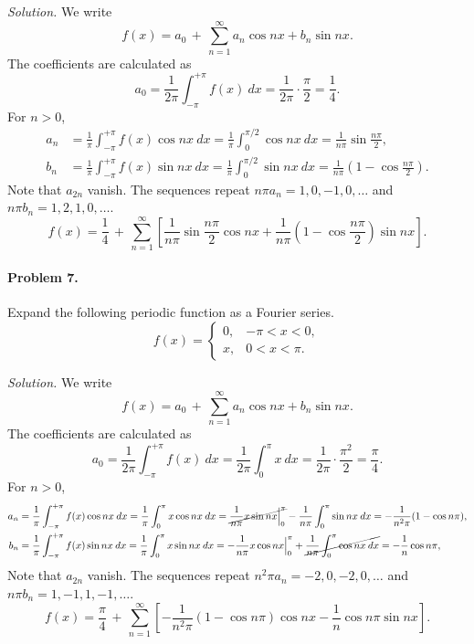 \documentclass[10pt]{article}
\begin{document}
        \textit{Solution.} We write
        \[
                f(x) = a_0 \,+\, \sum_{n = 1}^\infty a_n\cos{nx} + b_n\sin{nx}.
        \]
        The coefficients are calculated as
        \[
                a_0 = \frac{1}{2\pi}\int_{-\pi}^{+\pi} f(x)\:dx = \frac{1}{2\pi}\cdot \frac{\pi}{2} = \frac{1}{4}.
        \]
        For $n > 0$,
        \begin{align*}
                a_n &= \frac{1}{\pi}\int_{-\pi}^{+\pi} f(x)\cos{nx}\:dx = \frac{1}{\pi}\int_{0}^{\pi/2}\cos{nx}\:dx = \frac{1}{n\pi}\sin\frac{n\pi}{2}, \\
                b_n &= \frac{1}{\pi}\int_{-\pi}^{+\pi} f(x)\sin{nx}\:dx = \frac{1}{\pi}\int_{0}^{\pi/2}\sin{nx}\:dx = 
                        \frac{1}{n\pi}\left(1 - \cos\frac{n\pi}{2}\right).
        \end{align*}
        Note that $a_{2n}$ vanish. The sequences repeat $n\pi a_n = 1, 0, -1, 0, \dots$ and $n\pi b_n = 1, 2, 1, 0, \dots$.
        \[
                f(x) = \frac{1}{4} \,+\, \sum_{n = 1}^\infty \left[ \frac{1}{n\pi}\sin\frac{n\pi}{2}\cos{nx} + 
                        \frac{1}{n\pi}\left(1 - \cos\frac{n\pi}{2}\right)\sin{nx} \right].
        \]
        
        \paragraph{Problem 7.} Expand the following periodic function as a Fourier series.
        \[
                f(x) = \begin{cases}
                        0, & -\pi < x < 0,      \\
                        x, & 0 < x < \pi.
                \end{cases}
        \]
        
        \textit{Solution.} We write
        \[
                f(x) = a_0 \,+\, \sum_{n = 1}^\infty a_n\cos{nx} + b_n\sin{nx}.
        \]
        The coefficients are calculated as
        \[
                a_0 = \frac{1}{2\pi}\int_{-\pi}^{+\pi} f(x)\:dx = \frac{1}{2\pi}\int_0^\pi x\:dx = \frac{1}{2\pi}\cdot \frac{\pi^2}{2} = \frac{\pi}{4}.
        \]
        For $n > 0$,
        \begin{align*}
                a_n &= \frac{1}{\pi}\int_{-\pi}^{+\pi} f(x)\cos{nx}\:dx 
                        = \frac{1}{\pi}\int_0^\pi x\cos{nx}\:dx 
                        = \cancel{\frac{1}{n\pi}x\sin{nx}\Big|_0^\pi} - \frac{1}{n\pi}\int_0^\pi \sin{nx}\:dx 
                        = -\frac{1}{n^2\pi}(1 - \cos{n\pi}), \\
                b_n &= \frac{1}{\pi}\int_{-\pi}^{+\pi} f(x)\sin{nx}\:dx 
                        = \frac{1}{\pi}\int_0^\pi x\sin{nx}\:dx 
                        = -\frac{1}{n\pi}x\cos{nx}\Big|_0^\pi + \cancel{\frac{1}{n\pi}\int_0^\pi \cos{nx}\:dx }
                        = -\frac{1}{n}\cos{n\pi}, \\
        \end{align*}
        Note that $a_{2n}$ vanish. The sequences repeat $n^2\pi a_n = -2, 0, -2, 0, \dots$ and $n\pi b_n = 1, -1, 1, -1, \dots$.
        \[
                f(x) = \frac{\pi}{4} \,+\, \sum_{n = 1}^\infty\left[ -\frac{1}{n^2\pi}(1 - \cos{n\pi})\cos{nx} - \frac{1}{n}\cos{n\pi}\sin{nx} \right].
        \]
\end{document}
